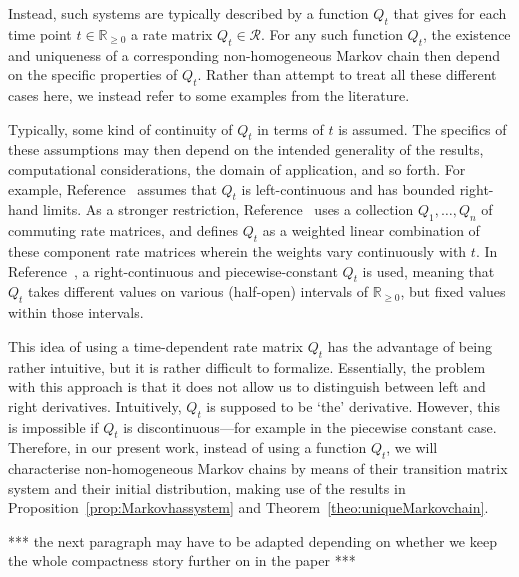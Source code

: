 \documentclass[10pt,a4paper]{paper}
\theoremstyle{definition}
\newcommand{\reals}{\mathbb{R}}
\newcommand{\realsnonneg}{\reals_{\geq 0}}
\begin{document}
Instead, such systems are typically described by a function $Q_t$ that gives for each time point $t\in\realsnonneg$ a rate matrix $Q_t\in\mathcal{R}$. For any such function $Q_t$, the existence and uniqueness of a corresponding non-homogeneous Markov chain then depend on the specific properties of $Q_t$. Rather than attempt to treat all these different cases here, we instead refer to some examples from the literature. 

Typically, some kind of continuity of $Q_t$ in terms of $t$ is assumed. The specifics of these assumptions may then depend on the intended generality of the results, computational considerations, the domain of application, and so forth. For example, Reference~\cite{aalen1978empirical} assumes that $Q_t$ is left-continuous and has bounded right-hand limits. As a stronger restriction, Reference~\cite{johnson1989nonhomogeneous} uses a collection $Q_1,\ldots,Q_n$ of commuting rate matrices, and defines $Q_t$ as a weighted linear combination of these component rate matrices wherein the weights vary continuously with $t$. In Reference~\cite{rindos1995exact}, a right-continuous and piecewise-constant $Q_t$ is used, meaning that $Q_t$ takes different values on various (half-open) intervals of $\realsnonneg$, but fixed values within those intervals.

This idea of using a time-dependent rate matrix $Q_t$ has the advantage of being rather intuitive, but it is rather difficult to formalize. Essentially, the problem with this approach is that it does not allow us to distinguish between left and right derivatives. Intuitively, $Q_t$ is supposed to be `the' derivative. However, this is impossible if $Q_t$ is discontinuous---for example in the piecewise constant case. Therefore, in our present work, instead of using a function $Q_t$, we will characterise non-homogeneous Markov chains by means of their transition matrix system and their initial distribution, making use of the results in Proposition~\ref{prop:Markovhassystem} and Theorem~\ref{theo:uniqueMarkovchain}.

*** the next paragraph may have to be adapted depending on whether we keep the whole compactness story further on in the paper ***
\end{document}
